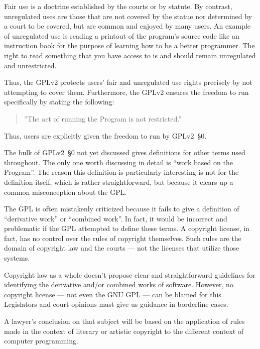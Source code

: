 Fair use is a doctrine established by the courts or by statute.  By
contrast, unregulated uses are those that are not covered by the statue
nor determined by a court to be covered, but are common and enjoyed by
many users.  An example of unregulated use is reading a printout of the
program's source code like an instruction book for the purpose of learning
how to be a better programmer.  The right to read something that you have
access to is and should remain unregulated and unrestricted.

\medskip

Thus, the GPLv2 protects users' fair and unregulated use rights precisely by
not attempting to cover them.  Furthermore, the GPLv2 ensures the freedom
to run specifically by stating the following:
\begin{quote}
''The act of running the Program is not restricted.''
\end{quote}
Thus, users are explicitly given the freedom to run by GPLv2~\S0.

\medskip

The bulk of GPLv2~\S0 not yet discussed gives definitions for other terms used
throughout.  The only one worth discussing in detail is ``work based on
the Program''.  The reason this definition is particularly interesting is
not for the definition itself, which is rather straightforward, but
because it clears up a common misconception about the GPL\@.

The GPL is often mistakenly criticized because it fails to give a
definition of ``derivative work'' or ``combined work''.  In fact, it would be incorrect and
problematic if the GPL attempted to define these terms.  A copyright license, in
fact, has no control over the rules of copyright themselves.  Such rules are
the domain of copyright law and the courts --- not the licenses that utilize
those systems.

Copyright law as a whole doesn't propose clear and straightforward guidelines
for identifying the derivative and/or combined works of software.  However,
no copyright license --- not even the GNU GPL --- can be blamed for this.
Legislators and court opinions must give us guidance in borderline cases.


A
lawyer’s conclusion on that subject will be based on the application of rules
made in the context of literary or artistic copyright to the different
context of computer programming.


